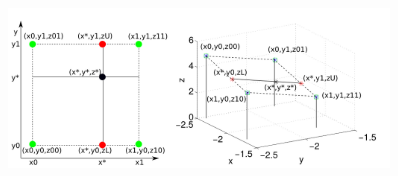 \begin{enumerate}
\begin{figure}[H]
  \begin{center}
    \includegraphics[height=0.4\textwidth,width=0.9\textwidth]{Graphics/TwoD_Interpolation.png}
  \end{center}
\end{figure}

\end{enumerate}

